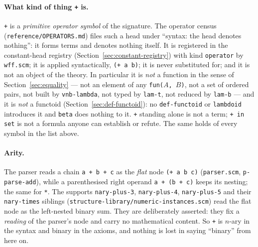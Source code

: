 \paragraph{What kind of thing \texttt{+} is.}
\texttt{+} is a \emph{primitive operator symbol} of the signature.  The
operator census (\texttt{reference/OPERATORS.md}) files such a head under
``syntax: the head denotes nothing'': it forms terms and denotes nothing itself.  It is
registered in the constant-head registry
(Section~\ref{sec:constant-registry}) with kind \texttt{operator} by
\texttt{wff.scm}; it is applied syntactically, \texttt{(+ a b)}; it is never
substituted for; and it is not an object of the theory.  In particular it is
\emph{not} a function in the sense of Section~\ref{sec:equality} --- not an
element of any \texttt{fun($A$, $B$)}, not a set of ordered pairs, not built
by \texttt{vnb-lambda}, not typed by \texttt{lam-t}, not reduced by
\texttt{lam-b} --- and it is \emph{not} a functoid (Section~\ref{sec:def-functoid}):
no \texttt{def-functoid} or \texttt{lambdoid} introduces it and \texttt{beta} does
nothing to it.  \texttt{+} standing alone is not a term; \texttt{+ in set} is
not a formula anyone can establish or refute.  The same holds of every symbol
in the list above.

\paragraph{Arity.}
The parser reads a chain \texttt{a + b + c} as the \emph{flat} node
\texttt{(+ a b c)} (\texttt{parser.scm}, \texttt{p-parse-add}), while a
parenthesised right operand \texttt{a + (b + c)} keeps its nesting; the same
for \texttt{*}.  The supports \texttt{nary-plus-3}, \texttt{nary-plus-4},
\texttt{nary-plus-5} and their \texttt{nary-times} siblings
(\texttt{structure-library/numeric-instances.scm}) read the flat node as the
left-nested binary sum.  They are deliberately asserted: they fix a
\emph{reading} of the parser's node and carry no mathematical content.  So
\texttt{+} is $n$-ary in the syntax and binary in the axioms, and nothing is
lost in saying ``binary'' from here on.

